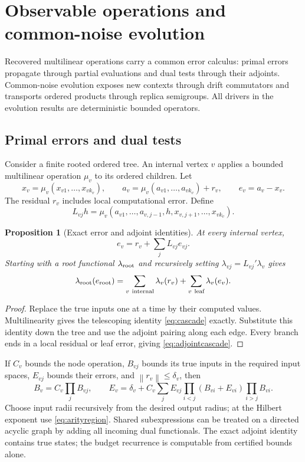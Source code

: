 \documentclass[11pt,a4paper]{amsart}
\numberwithin{equation}{section}
\newtheorem{proposition}[theorem]{Proposition}
\theoremstyle{definition}
\theoremstyle{remark}
\newcommand{\norm}[1]{\left\lVert#1\right\rVert}
\begin{document}
\section{Observable operations and common-noise evolution}\label{sec:transport}\label{sec:time}
Recovered multilinear operations carry a common error calculus: primal errors propagate through partial evaluations and dual tests through their adjoints. Common-noise evolution exposes new contexts through drift commutators and transports ordered products through replica semigroups. All drivers in the evolution results are deterministic bounded operators.

\subsection{Primal errors and dual tests}
Consider a finite rooted ordered tree. An internal vertex $v$ applies a bounded multilinear operation $\mu_v$ to its ordered children. Let
\[
 x_v=\mu_v(x_{v1},\ldots,x_{vk_v}),\qquad
 a_v=\mu_v(a_{v1},\ldots,a_{vk_v})+r_v,
 \qquad e_v=a_v-x_v.
\]
The residual $r_v$ includes local computational error. Define
\[
 L_{vj}h=\mu_v(a_{v1},\ldots,a_{v,j-1},h,x_{v,j+1},\ldots,x_{vk_v}).
\]
\begin{proposition}[Exact error and adjoint identities]\label{prop:cascade}
At every internal vertex,
\begin{equation}\label{eq:cascade}
 e_v=r_v+\sum_jL_{vj}e_{vj}.
\end{equation}
Starting with a root functional $\lambda_{\rm root}$ and recursively setting $\lambda_{vj}=L_{vj}'\lambda_v$ gives
\begin{equation}\label{eq:adjointcascade}
 \lambda_{\rm root}(e_{\rm root})
 =\sum_{v\ \text{internal}}\lambda_v(r_v)
  +\sum_{v\ \text{leaf}}\lambda_v(e_v).
\end{equation}
\end{proposition}
\begin{proof}
Replace the true inputs one at a time by their computed values. Multilinearity gives the telescoping identity \eqref{eq:cascade} exactly. Substitute this identity down the tree and use the adjoint pairing along each edge. Every branch ends in a local residual or leaf error, giving \eqref{eq:adjointcascade}.
\end{proof}

If $C_v$ bounds the node operation, $B_{vj}$ bounds its true inputs in the required input spaces, $E_{vj}$ bounds their errors, and $\norm{r_v}\le\delta_v$, then
\begin{equation}\label{eq:cascadebudget}
 B_v=C_v\prod_jB_{vj},\qquad
 E_v=\delta_v+C_v\sum_jE_{vj}
       \prod_{i<j}(B_{vi}+E_{vi})\prod_{i>j}B_{vi}.
\end{equation}
Choose input radii recursively from the desired output radius; at the Hilbert exponent use \eqref{eq:arityregion}. Shared subexpressions can be treated on a directed acyclic graph by adding all incoming dual functionals. The exact adjoint identity contains true states; the budget recurrence is computable from certified bounds alone.
\end{document}
